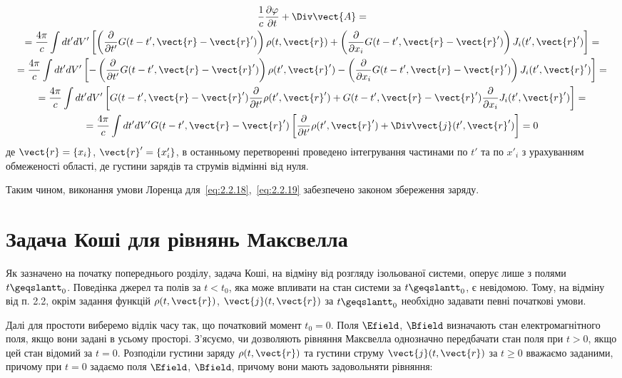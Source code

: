 \begin{multline*}
\frac{1}{c} \frac{\partial \varphi}{\partial t} + \Div\vect{A} = \\
= \frac{4\pi}{c} \int dt' dV' \left[ \left( \frac{\partial}{\partial t'} G(t - t', \vect{r} - \vect{r}') \right) \rho (t, \vect{r}) + \left(
\frac{\partial}{\partial x_i} G(t - t', \vect{r} - \vect{r}') \right) J_i (t', \vect{r}') \right] = \\
= \frac{4\pi}{c} \int dt' dV' \left[ - \left( \frac{\partial}{\partial t'} G(t - t', \vect{r} - \vect{r}') \right) \rho (t', \vect{r}') - \left(
\frac{\partial}{\partial x_i} G(t - t', \vect{r} - \vect{r}') \right) J_i (t', \vect{r}') \right] = \\
= \frac{4\pi}{c} \int dt' dV' \left[ G(t - t', \vect{r} - \vect{r}') \frac{\partial}{\partial t'} \rho (t', \vect{r}') + G(t - t', \vect{r} -
\vect{r}') \frac{\partial}{\partial x_i} J_i (t', \vect{r}') \right] = \\
= \frac{4\pi}{c} \int dt' dV' G(t - t', \vect{r} - \vect{r}') \left[ \frac{\partial}{\partial t'} \rho (t', \vect{r}') + \Div\vect{j}
(t', \vect{r}') \right] = 0
\end{multline*}
де \( \vect{r} = \{ x_i \} \), \( \vect{r}' = \{ x'_i \} \), в останньому перетворенні проведено інтегрування частинами по \( t' \) та по \( x'_i \) з
урахуванням обмеженості області, де густини зарядів та струмів відмінні від нуля.

Таким чином, виконання умови Лоренца для~\eqref{eq:2.2.18},~\eqref{eq:2.2.19} забезпечено законом збереження заряду.

\section{Задача Коші для рівнянь Максвелла}\label{sec:Cauchi}

Як зазначено на початку попереднього розділу, задача Коші, на відміну від розгляду ізольованої системи, оперує лише з полями \( t \geqslantt_0 \). Поведінка
джерел та полів за \( t < t_0 \), яка може впливати на стан системи за \( t \geqslantt_0 \), є невідомою. Тому, на відміну від п. 2.2, окрім задання функцій
\( \rho(t, \vect{r}) \), \( \vect{j}(t, \vect{r}) \) за \( t \geqslantt_0 \) необхідно задавати певні початкові умови.

Далі для простоти виберемо відлік часу так, що початковий момент \( t_0 = 0 \). Поля \( \Efield \), \( \Bfield \) визначають стан електромагнітного
поля, якщо вони задані в усьому просторі. З’ясуємо, чи дозволяють рівняння Максвелла однозначно передбачати стан поля при \( t > 0 \), якщо цей стан
відомий за \( t = 0 \). Розподіли густини заряду \( \rho(t, \vect{r}) \) та густини струму \( \vect{j}(t, \vect{r}) \) за \( t \geqslant0 \) вважаємо
заданими, причому при \( t = 0 \) задаємо поля \( \Efield \), \( \Bfield \), причому вони мають задовольняти рівняння:

